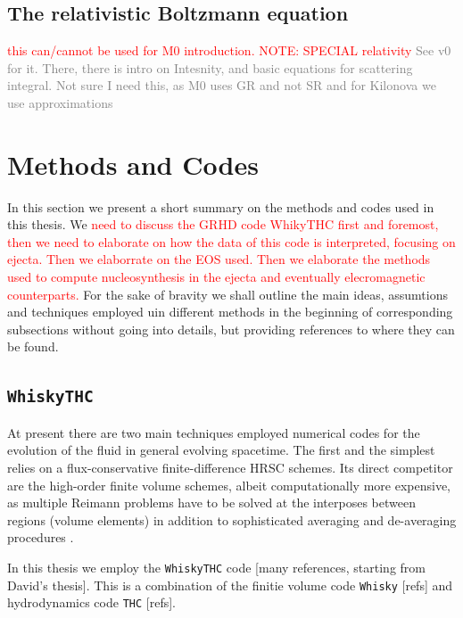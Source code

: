 \documentclass[11pt,a4paper,headinclude=true,DIV=14,BCOR=8mm,chapterprefix,listof=totoc,twoside,openright,abstracton]{scrbook}
\newcommand{\red}[1]{\textcolor{red}{#1}}
\newcommand{\gray}[1]{\textcolor{gray}{#1}}
\begin{document}
\subsection{The relativistic Boltzmann equation}
\red{this can/cannot be used for M0 introduction. NOTE: SPECIAL relativity}
\gray{See v0 for it. There, there is intro on Intesnity, and basic equations for scattering integral. Not sure I need this, as M0 uses GR and not SR and for Kilonova we use approximations}





\section{Methods and Codes}

In this section we present a short summary on the methods and codes used in this thesis. We \red{need to discuss the GRHD code WhikyTHC first and foremost, then we need to elaborate on how the data of this code is interpreted, focusing on ejecta. Then we elaborrate on the EOS used. Then we elaborate the methods used to compute nucleosynthesis in the ejecta and eventually elecromagnetic counterparts. } For the sake of bravity we shall outline the main ideas, assumtions and techniques employed uin different methods in the beginning of corresponding subsections without going into details, but providing references to where they can be found.

\subsection{\texttt{WhiskyTHC}}

At present there are two main techniques employed numerical codes for the evolution of the fluid in general evolving spacetime. The first and the simplest relies on a flux-conservative finite-difference HRSC schemes. Its direct competitor are the high-order finite volume schemes, albeit computationally more expensive, as multiple Reimann problems have to be solved at the interposes between regions (volume elements) \cite{Reisswig:2009us,Shu:2001rep} in addition to sophisticated averaging and de-averaging procedures \cite{Tchekhovskoy:2007zn}.

In this thesis we employ the \texttt{WhiskyTHC} code [many references, starting from David's thesis]. This is a combination of the finitie volume code \texttt{Whisky} [refs] and hydrodynamics code \texttt{THC} \cite{Radice:2012cu}[refs].
\end{document}
